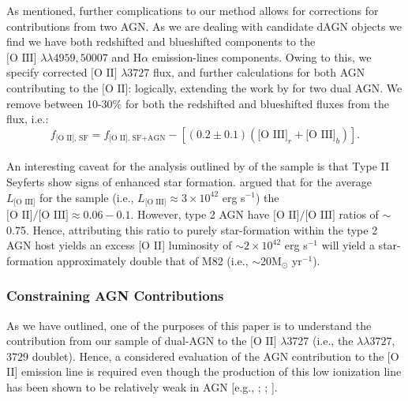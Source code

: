 As mentioned, further complications to our method allows for corrections for contributions from two AGN. As we are dealing with candidate dAGN objects we find we have both redshifted and blueshifted components to the $\text{[O III] }\lambda\lambda4959,50007$ and $\text{H}\alpha$ emission-lines components. Owing to this, we specify corrected $\text{[O II] }\lambda3727$ flux, and further calculations for both AGN contributing to the $\text{[O II]}$: logically, extending the work by \cite{2006ApJ...642..702K} for two dual AGN. We remove between 10-30\% for both the redshifted and blueshifted \text{[O III]} fluxes from the \text{[O II]} flux, i.e.:
\\
\begin{equation}
\label{eq:KimCorrection}
f_{\text{[O II], SF}}=f_{\text{[O II], SF+AGN}}-\left[(0.2\pm{0.1})(\text{[O III]}_r+\text{[O III]}_b)\right].
\end{equation}
\\
An interesting caveat for the analysis outlined by \cite{2006ApJ...642..702K} of the \cite{Zakamska2003} sample is that Type II Seyferts show signs of enhanced star formation. \cite{2006ApJ...642..702K} argued that for the average $L_{\text{[O III]}}$ for the \cite{Zakamska2003} sample (i.e., $L_{\text{[O III]}}\approx{3\times{10^{42}}}$ erg s$^{-1}$) the $\text{[O II]/[O III]}\approx{0.06-0.1}$. However, type 2 AGN have $\text{[O II]/[O III]}$ ratios of $\sim$0.75. Hence, attributing this ratio to purely star-formation within the type 2 AGN host yields an excess [O II] luminosity of $\sim{2\times{10^{42}}}$ erg s$^{-1}$ will yield a star-formation approximately double that of M82 (i.e., $\sim$20M$_{\odot}$ yr$^{-1}$).

\subsubsection{Constraining AGN Contributions}

As we have outlined, one of the purposes of this paper is to understand the contribution from our sample of dual-AGN to the $\text{[O II]}$ $\lambda$3727 (i.e., the $\lambda\lambda{3727}$,$3729$ doublet). Hence, a considered evaluation of the AGN contribution to the [O II] emission line is required even though the production of this low ionization line has been shown to be relatively weak in AGN [e.g., \cite{Ferland_1986}; \cite{Ho_1993}; \cite{2006ApJ...642..702K}].
